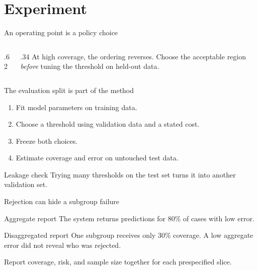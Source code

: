 \documentclass[10pt,aspectratio=169]{beamer}
\begin{document}
\section{Experiment}
\begin{frame}{An operating point is a policy choice}
\begin{columns}[T,onlytextwidth]
\begin{column}{.62\textwidth}
\end{column}
\begin{column}{.34\textwidth}
At high coverage, the ordering reverses.
\medskip
Choose the acceptable region \emph{before} tuning the threshold on held-out data.
\end{column}
\end{columns}
\end{frame}
\begin{frame}{The evaluation split is part of the method}
\begin{enumerate}[<+->]
\item Fit model parameters on training data.
\item Choose a threshold using validation data and a stated cost.
\item Freeze both choices.
\item Estimate coverage and error on untouched test data.
\end{enumerate}
\begin{alertblock}{Leakage check}
Trying many thresholds on the test set turns it into another validation set.
\end{alertblock}
\end{frame}
\begin{frame}{Rejection can hide a subgroup failure}
\begin{overprint}
\begin{block}{Aggregate report}
The system returns predictions for 80\% of cases with low error.
\end{block}
\begin{alertblock}{Disaggregated report}
One subgroup receives only 30\% coverage. A low aggregate error did not reveal who was rejected.
\end{alertblock}
\end{overprint}
\medskip
Report coverage, risk, and sample size together for each prespecified slice.
\end{frame}
\end{document}
